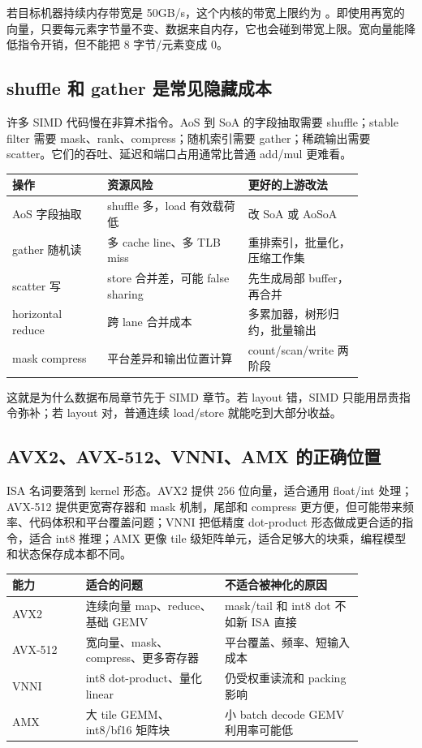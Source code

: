 若目标机器持续内存带宽是 50GB/s，这个内核的带宽上限约为 。即使用再宽的向量，只要每元素字节量不变、数据来自内存，它也会碰到带宽上限。宽向量能降低指令开销，但不能把 8 字节/元素变成 0。

\subsection{shuffle 和 gather 是常见隐藏成本}

许多 SIMD 代码慢在非算术指令。AoS 到 SoA 的字段抽取需要 shuffle；stable filter 需要 mask、rank、compress；随机索引需要 gather；稀疏输出需要 scatter。它们的吞吐、延迟和端口占用通常比普通 add/mul 更难看。

\begin{center}
\begin{tabular}{p{0.23\linewidth}p{0.34\linewidth}p{0.29\linewidth}}
\toprule
操作 & 资源风险 & 更好的上游改法 \\
\midrule
AoS 字段抽取 & shuffle 多，load 有效载荷低 & 改 SoA 或 AoSoA \\
gather 随机读 & 多 cache line、多 TLB miss & 重排索引，批量化，压缩工作集 \\
scatter 写 & store 合并差，可能 false sharing & 先生成局部 buffer，再合并 \\
horizontal reduce & 跨 lane 合并成本 & 多累加器，树形归约，批量输出 \\
mask compress & 平台差异和输出位置计算 & count/scan/write 两阶段 \\
\bottomrule
\end{tabular}
\end{center}

这就是为什么数据布局章节先于 SIMD 章节。若 layout 错，SIMD 只能用昂贵指令弥补；若 layout 对，普通连续 load/store 就能吃到大部分收益。

\subsection{AVX2、AVX-512、VNNI、AMX 的正确位置}

ISA 名词要落到 kernel 形态。AVX2 提供 256 位向量，适合通用 float/int 处理；AVX-512 提供更宽寄存器和 mask 机制，尾部和 compress 更方便，但可能带来频率、代码体积和平台覆盖问题；VNNI 把低精度 dot-product 形态做成更合适的指令，适合 int8 推理；AMX 更像 tile 级矩阵单元，适合足够大的块乘，编程模型和状态保存成本都不同。

\begin{center}
\begin{tabular}{p{0.18\linewidth}p{0.34\linewidth}p{0.34\linewidth}}
\toprule
能力 & 适合的问题 & 不适合被神化的原因 \\
\midrule
AVX2 & 连续向量 map、reduce、基础 GEMV & mask/tail 和 int8 dot 不如新 ISA 直接 \\
AVX-512 & 宽向量、mask、compress、更多寄存器 & 平台覆盖、频率、短输入成本 \\
VNNI & int8 dot-product、量化 linear & 仍受权重读流和 packing 影响 \\
AMX & 大 tile GEMM、int8/bf16 矩阵块 & 小 batch decode GEMV 利用率可能低 \\
\bottomrule
\end{tabular}
\end{center}

